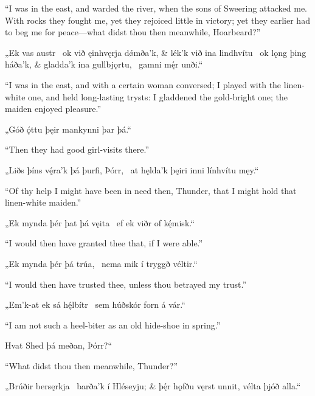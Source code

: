 \bvb “I was in the east, and warded the river, when the sons of Sweering attacked me. With rocks they fought me, yet they rejoiced little in victory; yet they earlier had to beg me for peace—what didst thou then meanwhile, Hoarbeard?”\evb
\evg


\bvg
\bva{}„Ek vas austr \hld\ ok við ęinhvęrja dǿmða’k, &
lék’k við ina lindhvítu \hld\ ok lǫng þing háða’k, &
gladda’k ina gullbjǫrtu, \hld\ gamni mę́r unði.“\eva

\bvb “I was in the east, and with a certain woman conversed; I played with the linen-white one, and held long-lasting trysts: I gladdened the gold-bright one; the maiden enjoyed pleasure.”\evb
\evg


\bvg
\bva{}„Góð ǫ́ttu þęir mankynni þar þá.“\eva

\bvb “Then they had good girl-visits there.”\evb
\evg


\bvg
\bva{}„Liðs þíns vę́ra’k þá þurfi, Þórr, \hld\ at hęlda’k þęiri inni línhvítu męy.“\eva

\bvb “Of thy help I might have been in need then, Thunder, that I might hold that linen-white maiden.”\evb
\evg


\bvg
\bva{}„Ek mynda þér þat þá vęita \hld\ ef ek viðr of kę́misk.“\eva

\bvb “I would then have granted thee that, if I were able.”\evb
\evg


\bvg
\bva{}„Ek mynda þér þá trúa, \hld\ nema mik í tryggð véltir.“\eva

\bvb “I would then have trusted thee, unless thou betrayed my trust.”\evb
\evg


\bvg
\bva{}„Em’k-at ek sá hę́lbítr \hld\ sem húðskór forn á vár.“\eva

\bvb “I am not such a heel-biter as an old hide-shoe in spring.”\evb
\evg


\bvg
\bva{}\ind Hvat Shed þá meðan, Þórr?“\eva

\bvb “What didst thou then meanwhile, Thunder?”\evb
\evg


\bvg
\bva{}„Brúðir bersęrkja \hld\ barða’k í Hléseyju; &
þę́r hǫfðu vęrst unnit, \hld vélta þjóð alla.“\eva

